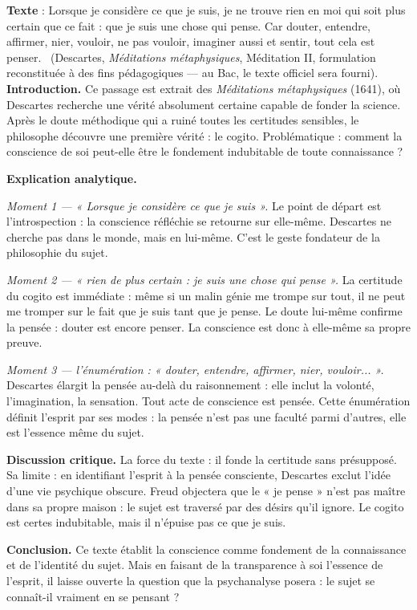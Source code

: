 \documentclass[11pt]{article}
\newcommand{\cle}[1]{{\popxbold\color{popdark}#1}}
\begin{document}
\begin{exoresolu}
\textbf{Texte} : \guillemotleft Lorsque je considère ce que je suis, je ne trouve rien en moi qui soit plus certain que ce fait : que je suis une chose qui pense. Car douter, entendre, affirmer, nier, vouloir, ne pas vouloir, imaginer aussi et sentir, tout cela est penser. \guillemotright\ (Descartes, \emph{Méditations métaphysiques}, Méditation II, formulation reconstituée à des fins pédagogiques — au Bac, le texte officiel sera fourni).
\tcblower
\textbf{Introduction.} Ce passage est extrait des \emph{Méditations métaphysiques} (1641), où Descartes recherche une vérité absolument certaine capable de fonder la science. Après le doute méthodique qui a ruiné toutes les certitudes sensibles, le philosophe découvre une première vérité : le \cle{cogito}. Problématique : comment la conscience de soi peut-elle être le fondement indubitable de toute connaissance ?

\textbf{Explication analytique.}

\emph{Moment 1 — « Lorsque je considère ce que je suis ».} Le point de départ est l'introspection : la \cle{conscience réfléchie} se retourne sur elle-même. Descartes ne cherche pas dans le monde, mais en lui-même. C'est le geste fondateur de la philosophie du sujet.

\emph{Moment 2 — « rien de plus certain : je suis une chose qui pense ».} La certitude du cogito est immédiate : même si un malin génie me trompe sur tout, il ne peut me tromper sur le fait que je suis tant que je pense. Le doute lui-même confirme la pensée : douter est encore penser. La conscience est donc à elle-même sa propre preuve.

\emph{Moment 3 — l'énumération : « douter, entendre, affirmer, nier, vouloir... ».} Descartes élargit la pensée au-delà du raisonnement : elle inclut la volonté, l'imagination, la sensation. Tout acte de conscience est pensée. Cette énumération définit l'esprit par ses modes : la pensée n'est pas une faculté parmi d'autres, elle est l'essence même du sujet.

\textbf{Discussion critique.} La force du texte : il fonde la certitude sans présupposé. Sa limite : en identifiant l'esprit à la pensée consciente, Descartes exclut l'idée d'une vie psychique obscure. Freud objectera que le « je pense » n'est pas maître dans sa propre maison : le sujet est traversé par des désirs qu'il ignore. Le cogito est certes indubitable, mais il n'épuise pas ce que je suis.

\textbf{Conclusion.} Ce texte établit la conscience comme fondement de la connaissance et de l'identité du sujet. Mais en faisant de la transparence à soi l'essence de l'esprit, il laisse ouverte la question que la psychanalyse posera : le sujet se connaît-il vraiment en se pensant ?
\end{exoresolu}
\end{document}
